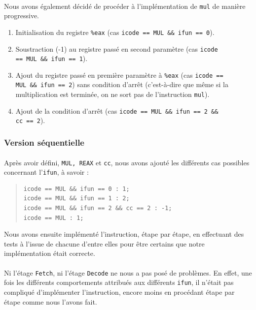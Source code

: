 \documentclass[12pt]{article}
\begin{document}
\paragraph{}Nous avons également décidé de procéder à l'implémentation de \verb+mul+ de manière progressive.
\begin{enumerate}
\item Initialisation du registre \verb+%eax+ (cas \verb+icode == MUL && ifun == 0+).
\item Soustraction (-1) au registre passé en second paramètre (cas \verb+icode+
  \\\verb+== MUL && ifun == 1+).
\item Ajout du registre passé en première paramètre à \verb+%eax+ (cas \verb+icode ==+
  \\\verb+MUL && ifun == 2+) sans condition d'arrêt (c'est-à-dire que même si la multiplication est terminée, on ne sort pas de l'instruction \verb+mul+).
\item Ajout de la condition d'arrêt (cas \verb+icode == MUL && ifun == 2 &&+
  \\\verb+cc == 2+).
\end{enumerate}

\subsubsection{Version séquentielle}
\paragraph{}Après avoir défini, \verb+MUL, REAX+ et \verb+cc+, nous avons ajouté les différents cas possibles concernant l'\verb+ifun+, à savoir :
\begin{quote}
\begin{verbatim}
icode == MUL && ifun == 0 : 1;
icode == MUL && ifun == 1 : 2;
icode == MUL && ifun == 2 && cc == 2 : -1;
icode == MUL : 1;
\end{verbatim}
\end{quote}
Nous avons ensuite implémenté l'instruction, étape par étape, en effectuant des tests à l'issue de chacune d'entre elles pour être certains que notre implémentation était correcte.

\paragraph{}Ni l'étage \verb+Fetch+, ni l'étage \verb+Decode+ ne nous a pas posé de problèmes. En effet, une fois les différents comportements attribués aux différents \verb+ifun+, il n'était pas compliqué d'implémenter l'instruction, encore moins en procédant étape par étape comme nous l'avons fait.
\end{document}

